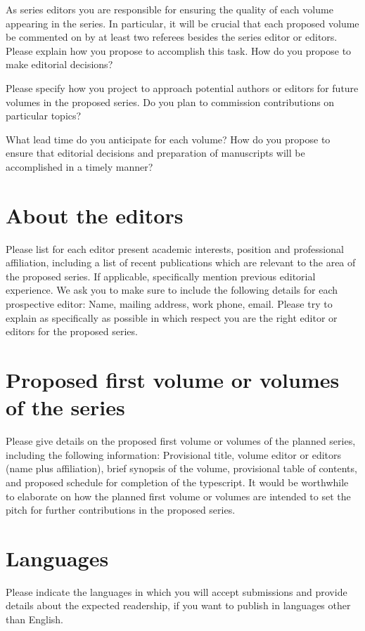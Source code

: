 \documentclass{article}
\begin{document}
As series editors you are responsible for ensuring the quality of
each volume appearing in the series. In particular, it will be crucial
that each proposed volume be commented on by at least two referees
besides the series editor or editors. Please explain how you propose
to accomplish this task. How do you propose to make editorial decisions?

Please specify how you project to approach potential authors or editors
for future volumes in the proposed series. Do you plan to commission
contributions on particular topics?

What lead time do you anticipate for each volume? How do you propose
to ensure that editorial decisions and preparation of manuscripts
will be accomplished in a timely manner?


\section{About the editors}

Please list for each editor present academic interests, position and
professional affiliation, including a list of recent publications
which are relevant to the area of the proposed series. If applicable,
specifically mention previous editorial experience. We ask you to
make sure to include the following details for each prospective editor:
Name, mailing address, work phone, email. Please try to explain as
specifically as possible in which respect you are the right editor
or editors for the proposed series.


\section{Proposed first volume or volumes of the series}

Please give details on the proposed first volume or volumes of the
planned series, including the following information: Provisional title,
volume editor or editors (name plus affiliation), brief synopsis of
the volume, provisional table of contents, and proposed schedule for
completion of the typescript. It would be worthwhile to elaborate
on how the planned first volume or volumes are intended to set the
pitch for further contributions in the proposed series.

\section{Languages}

Please indicate the languages in which you will accept submissions and provide details about the
expected readership, if you want to publish in languages other than English.
\end{document}
